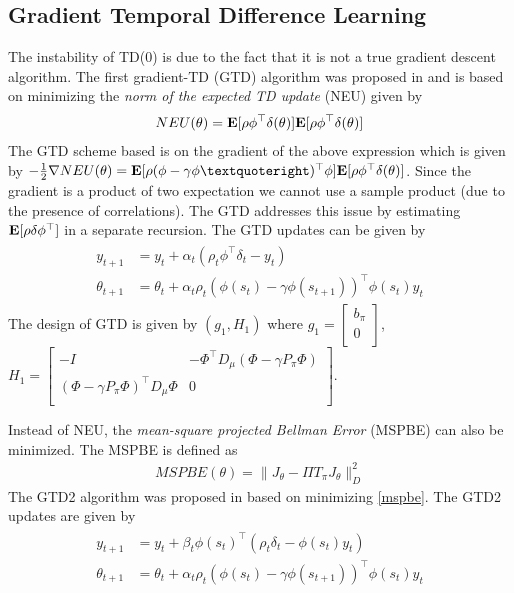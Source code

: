 \subsection{Gradient Temporal Difference Learning}
The instability of TD($0$) is due to the fact that it is not a true gradient descent algorithm. The first gradient-TD (GTD) algorithm was proposed in \cite{} and is based on minimizing the \emph{norm of the expected TD update} (NEU) given by
\begin{align}\label{neu}
NEU(\theta)=\mathbf{E}[\rho\phi^\top\delta(\theta)]\mathbf{E}[\rho\phi^\top\delta(\theta)]
\end{align}
The GTD scheme based is on the gradient of the above expression which is given by $-\frac{1}{2}\nabla NEU(\theta)=\E[\rho (\phi-\gamma\phi’)^\top \phi]\E[\rho \phi^\top\delta(\theta)]$. Since the gradient is a product of two expectation we cannot use a sample product (due to the presence of correlations). The GTD addresses this issue by estimating $\mathbf{E}[\rho\delta\phi^\top]$ in a separate recursion. The GTD updates can be given by
\begin{align}
\begin{split}
y_{t+1}&=y_t+\alpha_t(\rho_t\phi^\top\delta_t -y_t)\\
\theta_{t+1}&=\theta_t+\alpha_t\rho_t(\phi(s_t)-\gamma\phi(s_{t+1}))^\top\phi(s_t)y_t
\end{split}
\end{align}
The design of GTD is given by $(g_1,H_1)$ where $g_1=\begin{bmatrix}b_\pi\\ 0\\ \end{bmatrix}$, $H_1=\begin{bmatrix}-I &-\Phi^\top D_\mu (\Phi -\gamma P_\pi\Phi) \\ (\Phi -\gamma P_\pi\Phi)^\top D_\mu\Phi &0 \\ \end{bmatrix}$.\par
Instead of NEU, the \emph{mean-square projected Bellman Error} (MSPBE) can also be minimized. The MSPBE is defined as
\begin{align}\label{mspbe}
MSPBE(\theta)=\parallel J_\theta-\Pi T_\pi J_\theta \parallel^2_D
\end{align}
The GTD2 algorithm was proposed in \cite{} based on minimizing \eqref{mspbe}. The GTD2 updates are given by
\begin{align}
\begin{split}
y_{t+1}&=y_t+\beta_t\phi(s_t)^\top(\rho_t\delta_t-\phi(s_t)y_t)\\
\theta_{t+1}&=\theta_t+\alpha_t\rho_t(\phi(s_t)-\gamma\phi(s_{t+1}))^\top\phi(s_t)y_t
\end{split}
\end{align}
